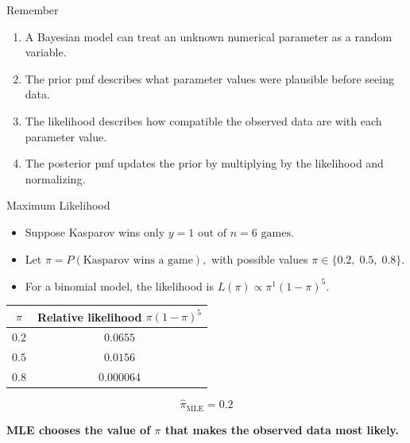 \documentclass[12pt]{beamer}
\begin{document}
\begin{frame}{}
\begin{block}{Remember}
\begin{enumerate}
\item A Bayesian model can treat an unknown numerical parameter as a random variable.
\item The prior pmf describes what parameter values were plausible before seeing data.
\item The likelihood describes how compatible the observed data are with each parameter value.
\item The posterior pmf updates the prior by multiplying by the likelihood and normalizing.
\end{enumerate}
\end{block}
\end{frame}

\begin{frame}{}
\begin{block}{Maximum Likelihood}

\begin{itemize}
\item Suppose Kasparov wins only $y=1 \text{ out of } n=6 \text{ games.}$
\item Let $\pi = P(\text{Kasparov wins a game}),$ with possible values $\pi \in \{0.2,\;0.5,\;0.8\}.$
\item For a binomial model, the likelihood is
$
L(\pi)
\propto
\pi^1(1-\pi)^5.
$
\end{itemize}

\begin{center}
\begin{tabular}{c c}
\toprule
$\pi$ & Relative likelihood $\pi(1-\pi)^5$ \\
\midrule
$0.2$ & $0.0655$ \\
$0.5$ & $0.0156$ \\
$0.8$ & $0.000064$ \\
\bottomrule
\end{tabular}
\end{center}

\[
\boxed{\hat{\pi}_{\text{MLE}} = 0.2}
\]

\textbf{MLE chooses the value of $\pi$ that makes the observed data most likely.}
\end{block}
\end{frame}
\end{document}
